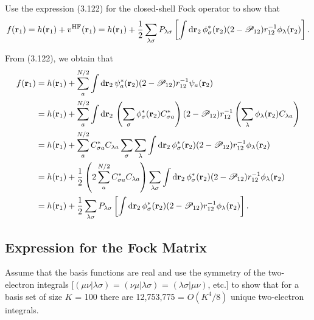 \documentclass[a4paper]{book}
\newcounter{exercise}[chapter]
\newcounter{solution}[chapter]
\newcommand*{\dif}{\mathop{}\!\mathrm{d}}
\newcommand{\HF}{{\rm HF}}
\newcommand{\bfr}{{\bf r}}
\begin{document}
	\begin{exercise}
	Use the expression (3.122) for the closed-shell Fock operator to show that
	\[
		f({\bf r}_1) = h({\bf r}_1) + v^\HF( {\bf r}_1 ) = h({\bf r}_1) + \frac{1}{2} \sum_{\lambda\sigma} P_{\lambda\sigma} \left[ \int \dif \bfr_2 \, \phi^*_\sigma( {\bf r}_2 ) ( 2 - \mathscr{P}_{12} ) r^{-1}_{12} \phi_\lambda( {\bf r}_2 ) \right].
	\]
	\end{exercise}
	
	\begin{solution}
	
	From (3.122), we obtain that
	\begin{align*}
		f({\bf r}_1) &= h({\bf r}_1) + \sum_a^{N/2} \int \dif \bfr_2 \, \psi^*_a( {\bf r}_2 ) ( 2 - \mathscr{P}_{12} ) r^{-1}_{12} \psi_a( {\bf r}_2 ) \\
		&= h({\bf r}_1) + \sum_a^{N/2} \int \dif \bfr_2 \, \left( \sum_\sigma \phi^*_\sigma( {\bf r}_2 ) C^*_{\sigma a} \right) ( 2 - \mathscr{P}_{12} ) r^{-1}_{12} \left( \sum_\lambda \phi_\lambda( {\bf r}_2 ) C_{\lambda a} \right) \\
		&= h({\bf r}_1) + \sum_a^{N/2} C^*_{\sigma a} C_{\lambda a} \sum_\sigma \sum_\lambda \int \dif \bfr_2 \, \phi^*_\sigma( {\bf r}_2 )( 2 - \mathscr{P}_{12} ) r^{-1}_{12} \phi_\lambda( {\bf r}_2 ) \\
		&= h({\bf r}_1) + \frac{1}{2} \left( 2 \sum_a^{N/2} C^*_{\sigma a} C_{\lambda a} \right) \sum_{\lambda \sigma} \int \dif \bfr_2 \, \phi^*_\sigma( {\bf r}_2 )( 2 - \mathscr{P}_{12} ) r^{-1}_{12} \phi_\lambda( {\bf r}_2 ) \\
		&= h({\bf r}_1) + \frac{1}{2} \sum_{\lambda\sigma} P_{\lambda\sigma} \left[ \int \dif \bfr_2 \, \phi^*_\sigma( {\bf r}_2 ) ( 2 - \mathscr{P}_{12} ) r^{-1}_{12} \phi_\lambda( {\bf r}_2 ) \right].
	\end{align*}		
	
	\end{solution}
	
	\subsection{Expression for the Fock Matrix}
	
	\begin{exercise}
	Assume that the basis functions are real and use the symmetry of the two-electron integrals [$(\mu\nu|\lambda\sigma)$ = $(\nu\mu|\lambda\sigma)$ = $(\lambda\sigma|\mu\nu)$, etc.] to show that for a basis set of size $K$ = 100 there are 12,753,775 = $O(K^4/8)$ unique two-electron integrals.
	\end{exercise}
	
\end{document}

